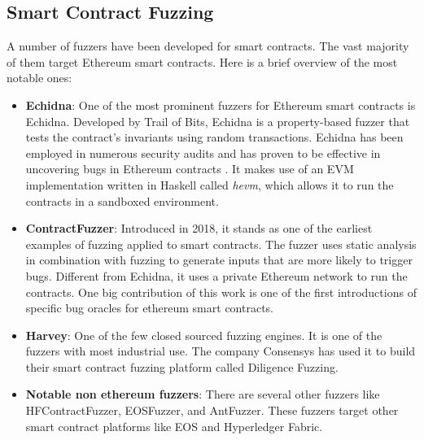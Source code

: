 \subsection*{Smart Contract Fuzzing}
A number of fuzzers have been developed for smart contracts.
The vast majority of them target Ethereum smart contracts.
Here is a brief overview of the most notable ones:
\begin{itemize}
    \item \textbf{Echidna}: One of the most prominent fuzzers for Ethereum smart contracts is Echidna. Developed by Trail of Bits, Echidna is a property-based fuzzer that tests the contract's invariants using random transactions.
          Echidna has been employed in numerous security audits and has proven to be effective in uncovering bugs in Ethereum contracts \cite{grieco_echidna_2020}.
          It makes use of an EVM implementation written in Haskell called \textit{hevm}, which allows it to run the contracts in a sandboxed environment.

    \item \textbf{ContractFuzzer}: Introduced in 2018, it stands as one of the earliest examples of fuzzing applied to smart contracts.
          The fuzzer uses static analysis in combination with fuzzing to generate inputs that are more likely to trigger bugs.
          Different from Echidna, it uses a private Ethereum network to run the contracts.
          One big contribution of this work is one of the first introductions of specific bug oracles for ethereum smart contracts.
    \item \textbf{Harvey}: One of the few closed sourced fuzzing engines.
          It is one of the fuzzers with most industrial use.
          The company Consensys has used it to build their smart contract fuzzing platform called Diligence Fuzzing.
    \item \textbf{Notable non ethereum fuzzers}: There are several other fuzzers like HFContractFuzzer, EOSFuzzer, and AntFuzzer.
          These fuzzers target other smart contract platforms like EOS and Hyperledger Fabric.

\end{itemize}

